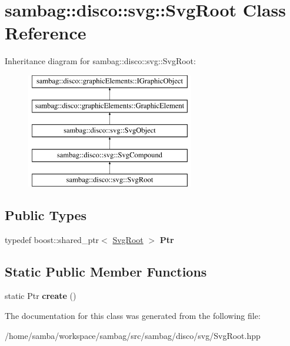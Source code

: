 \hypertarget{classsambag_1_1disco_1_1svg_1_1_svg_root}{
\section{sambag::disco::svg::SvgRoot Class Reference}
\label{classsambag_1_1disco_1_1svg_1_1_svg_root}
}
Inheritance diagram for sambag::disco::svg::SvgRoot:\begin{figure}[H]
\begin{center}
\leavevmode
\includegraphics[height=5.000000cm]{classsambag_1_1disco_1_1svg_1_1_svg_root}
\end{center}
\end{figure}
\subsection*{Public Types}
\begin{DoxyCompactItemize}
\item 
\hypertarget{classsambag_1_1disco_1_1svg_1_1_svg_root_ad634cc2a6f9798fa68c99d6f0401adc9}{
typedef boost::shared\_\-ptr$<$ \hyperlink{classsambag_1_1disco_1_1svg_1_1_svg_root}{SvgRoot} $>$ {\bfseries Ptr}}
\label{classsambag_1_1disco_1_1svg_1_1_svg_root_ad634cc2a6f9798fa68c99d6f0401adc9}

\end{DoxyCompactItemize}
\subsection*{Static Public Member Functions}
\begin{DoxyCompactItemize}
\item 
\hypertarget{classsambag_1_1disco_1_1svg_1_1_svg_root_a970150ebe3be1ceef4c07d0b552e68ee}{
static Ptr {\bfseries create} ()}
\label{classsambag_1_1disco_1_1svg_1_1_svg_root_a970150ebe3be1ceef4c07d0b552e68ee}

\end{DoxyCompactItemize}


The documentation for this class was generated from the following file:\begin{DoxyCompactItemize}
\item 
/home/samba/workspace/sambag/src/sambag/disco/svg/SvgRoot.hpp\end{DoxyCompactItemize}
